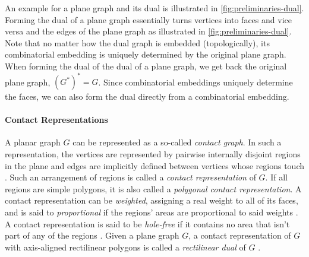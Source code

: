 An example for a plane graph and its dual is illustrated in \cref{fig:preliminaries-dual}. Forming the dual of a plane graph essentially turns vertices into faces and vice versa and  the edges of the plane graph as illustrated in \cref{fig:preliminaries-dual}. Note that no matter how the dual graph is embedded (topologically), its combinatorial embedding is uniquely determined by the original plane graph. When forming the dual of the dual of a plane graph, we get back the original plane graph, \ie{} $(G^*)^* = G$. Since combinatorial embeddings uniquely determine the faces, we can also form the dual directly from a combinatorial embedding.




\paragraph{Contact Representations}

\begin{definition}
	A planar graph $G$ can be represented as a so-called \emph{contact graph}. In such a representation, the vertices are represented by pairwise internally disjoint regions in the plane and edges are implicitly defined between vertices whose regions touch \cite{alam2013linear}.
	Such an arrangement of regions is called a \emph{contact representation} of $G$. If all regions are simple polygons, it is also called a \emph{polygonal contact representation}.
	A contact representation can be \emph{weighted}, assigning a real weight to all of its faces, and is said to \emph{proportional} if the regions' areas are proportional to said weights \cite{alam2013linear}.
	A contact representation is said to be \emph{hole-free} if it contains no area that isn't part of any of the regions \cite{alam2013linear}.
	Given a plane graph $G$, a contact representation of $G$ with axis-aligned rectilinear polygons is called a \emph{rectilinear dual} of $G$ \cite{alam2013computing}.
\end{definition}

